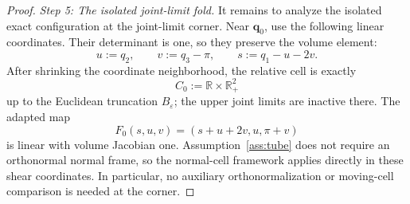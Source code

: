\documentclass[10pt,a4paper]{amsart}
\newcommand{\R}{\mathbb{R}}
\newcommand{\eps}{\varepsilon}
\begin{document}
\begin{proof}
\smallskip
\noindent\emph{Step 5: The isolated joint-limit fold.}
It remains to analyze the isolated exact configuration at the joint-limit
corner.  Near $\bm q_0$, use the following linear coordinates.  Their determinant
is one, so they preserve the volume element:
\begin{equation}\label{eq:robot-corner-coordinates}
 u:=q_2,
 \qquad
 v:=q_3-\pi,
 \qquad
 s:=q_1-u-2v.
\end{equation}
After shrinking the coordinate neighborhood, the relative cell is exactly
\[
 C_0:=\R\times\R_+^2
\]
up to the Euclidean truncation $B_\eps$; the upper joint limits are inactive
there.  The adapted map
\[
 F_0(s,u,v)=(s+u+2v,u,\pi+v)
\]
is linear with volume Jacobian one.  Assumption~\ref{ass:tube} does not require
an orthonormal normal frame, so the normal-cell framework applies directly in
these shear coordinates.  In particular, no auxiliary orthonormalization or
moving-cell comparison is needed at the corner.


\end{proof}
\end{document}
